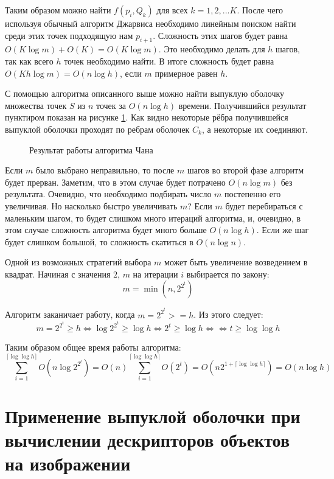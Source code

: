 Таким образом можно найти $f(p_i, Q_k)$ для всех $k=1,2,...K$. После чего используя обычный алгоритм Джарвиса необходимо линейным поиском найти среди этих точек подходящую нам $p_{i+1}$. Сложность этих шагов будет равна $O(K \log m) + O(K) = O(K \log m)$. Это необходимо делать для $h$ шагов, так как всего $h$ точек необходимо найти. В итоге сложность будет равна $O(K h \log m) = O(n \log h)$, если $m$ примерное равен $h$.

С помощью алгоритма описанного выше можно найти выпуклую оболочку множества точек $S$ из $n$ точек за $O(n \log h)$ времени. Получившийся результат пунктиром показан на рисунке \ref{img:chan_2}. Как видно некоторые рёбра получившейся выпуклой оболочки проходят по ребрам оболочек $C_k$, а некоторые их соединяют.

\begin{figure}[H]
	\centering
	
	\caption{Результат работы алгоритма Чана}
	\label{img:chan_2}
\end{figure}

Если $m$ было выбрано неправильно, то после $m$ шагов во второй фазе алгоритм будет прерван. Заметим, что в этом случае будет потрачено $O(n \log m)$ без результата. Очевидно, что необходимо подбирать число $m$ постепенно его увеличивая. Но насколько быстро увеличивать $m$? Если $m$ будет перебираться с маленьким шагом, то будет слишком много итераций алгоритма, и, очевидно, в этом случае сложность алгоритма будет много больше $O(n \log h)$. Если же шаг будет слишком большой, то сложность скатиться в $O(n \log n)$.

Одной из возможных стратегий выбора $m$ может быть увеличение возведением в квадрат. Начиная с значения $2$, $m$ на итерации $i$ выбирается по закону:
\[
m = \min (n,2^{2^t})
\]

Алгоритм заканичает работу, когда $m = 2^{2^t} >= h$. Из этого следует:
\[
m = 2^{2^t} \geq h \iff \log 2^{2^t} \geq \log h \iff 2^t \geq \log h \iff \iff t \geq \log \log h
\]

Таким образом общее время работы алгоритма:
\[
\sum_{i=1}^{\lceil \log \log h \rceil} O(n \log 2^{2^t}) = O(n) \sum_{i=1}^{\lceil \log \log h \rceil} O(2^t) = O(n 2^{1+\lceil \log \log h \rceil}) = O(n \log h)
\]

\section{Применение выпуклой оболочки при вычислении дескрипторов объектов на изображении}

